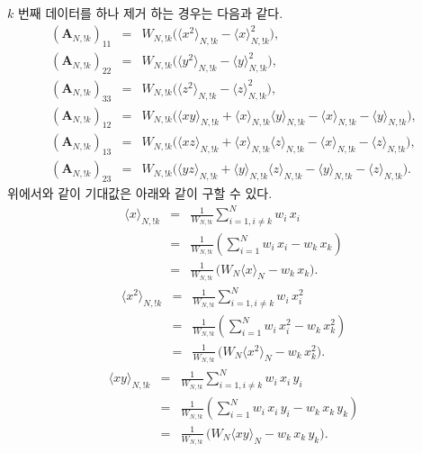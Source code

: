 \documentclass[chapter,a4paper,12pt]{oblivoir}
\begin{document}
$k$ 번째 데이터를 하나 제거 하는 경우는 다음과 같다.
\begin{eqnarray}
\left(\mathbf{A}_{N,!k}\right)_{11} &=& W_{N,!k}\Big(\langle x^2 \rangle_{N,!k} -\langle x \rangle_{N,!k}^2\Big), \\
\left(\mathbf{A}_{N,!k}\right)_{22} &=& W_{N,!k}\Big(\langle y^2 \rangle_{N,!k} -\langle y \rangle_{N,!k}^2\Big), \\
\left(\mathbf{A}_{N,!k}\right)_{33} &=& W_{N,!k}\Big(\langle z^2 \rangle_{N,!k} -\langle z \rangle_{N,!k}^2\Big), \\
\left(\mathbf{A}_{N,!k}\right)_{12} &=& W_{N,!k} \Big(\langle xy \rangle_{N,!k} + \langle x \rangle_{N,!k}\langle y \rangle_{N,!k} - \langle x \rangle_{N,!k} - \langle y \rangle_{N,!k} \Big), \\
\left(\mathbf{A}_{N,!k}\right)_{13} &=& W_{N,!k} \Big(\langle xz \rangle_{N,!k} + \langle x \rangle_{N,!k}\langle z \rangle_{N,!k} - \langle x \rangle_{N,!k} - \langle z \rangle_{N,!k} \Big), \\
\left(\mathbf{A}_{N,!k}\right)_{23} &=& W_{N,!k} \Big(\langle yz \rangle_{N,!k} + \langle y \rangle_{N,!k}\langle z \rangle_{N,!k} - \langle y \rangle_{N,!k} - \langle z \rangle_{N,!k} \Big). 
\end{eqnarray}
위에서와 같이 기대값은 아래와 같이 구할 수 있다.
\begin{eqnarray}
\langle x \rangle_{N,!k} &=& \frac{1}{W_{N,!k}}\sum_{i=1, i\neq k}^{N}w_i\,x_i \\
&=& \frac{1}{W_{N,!k}}\left(\sum_{i=1}^{N}w_i\,x_i - w_{k}\,x_{k}\right)\nonumber\\
&=& \frac{1}{W_{N,!k}}\,\Big(W_N\langle x \rangle_N - w_{k}\,x_{k}\Big).\nonumber
\end{eqnarray}
\begin{eqnarray}
\langle x^2 \rangle_{N,!k} &=& \frac{1}{W_{N,!k}}\sum_{i=1, i\neq k}^{N}w_i\,x_i^2 \\
&=& \frac{1}{W_{N,!k}}\left(\sum_{i=1}^{N}w_i\,x_i^2 - w_{k}\,x_{k}^2\right)\nonumber\\
&=& \frac{1}{W_{N,!k}}\,\Big(W_N\langle x^2 \rangle_N - w_{k}\,x_{k}^2\Big).\nonumber
\end{eqnarray}
\begin{eqnarray}
\langle xy \rangle_{N,!k} &=& \frac{1}{W_{N,!k}}\sum_{i=1, i\neq k}^{N}w_i\,x_i\,y_i \\
&=& \frac{1}{W_{N,!k}}\left(\sum_{i=1}^{N}w_i\,x_i\,y_i - w_{k}\,x_{k}\,y_{k}\right)\nonumber\\
&=& \frac{1}{W_{N,!k}}\,\Big(W_N\langle xy \rangle_N - w_{k}\,x_{k}\,y_{k}\Big).\nonumber
\end{eqnarray}
\end{document}
